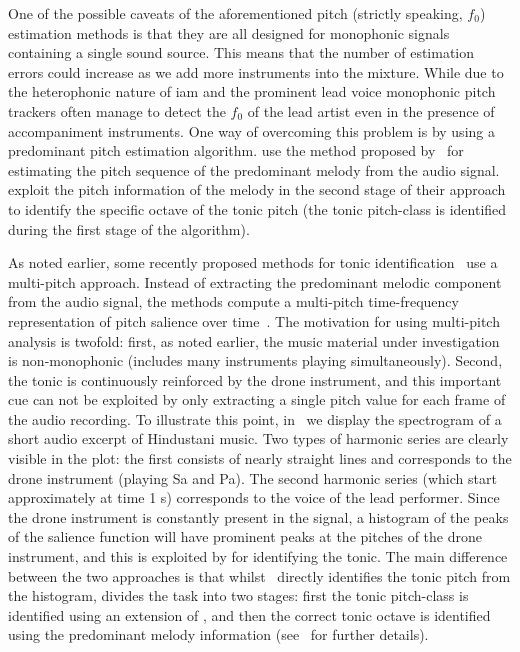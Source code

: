 {One of the possible caveats of the aforementioned pitch (strictly speaking, $f_0$) estimation methods is that they are all designed for monophonic signals containing a single sound source. This means that the number of estimation errors could increase as we add more instruments into the mixture. While due to the heterophonic nature of \gls{iam} and the prominent lead voice monophonic pitch trackers often manage to detect the $f_0$ of the lead artist even in the presence of accompaniment instruments. One way of overcoming this problem is by using a predominant pitch estimation algorithm. \cite{gulati2012two} use the method proposed by~\cite{Salamon2012} for estimating the pitch sequence of the predominant melody from the audio signal. \cite{gulati2012two} exploit the pitch information of the melody in the second stage of their approach to identify the specific octave of the tonic pitch (the tonic pitch-class is identified during the first stage of the algorithm).

As noted earlier, some recently proposed methods for tonic identification~\citep{salamon2012multipitch,gulati2012two} use a multi-pitch approach. Instead of extracting the predominant melodic component from the audio signal, the methods compute a multi-pitch time-frequency representation of pitch salience over time~\citep{Salamon2011}. The motivation for using multi-pitch analysis is twofold: first, as noted earlier, the music material under investigation is non-monophonic (includes many instruments playing simultaneously). Second, the tonic is continuously reinforced by the drone instrument, and this important cue can not be exploited by only extracting a single pitch value for each frame of the audio recording. To illustrate this point, in~ we display the spectrogram of a short audio excerpt of Hindustani music. Two types of harmonic series are clearly visible in the plot: the first consists of nearly straight lines and corresponds to the drone instrument (playing Sa and Pa). The second harmonic series (which start approximately at time 1 s) corresponds to the voice of the lead performer. Since the drone instrument is constantly present in the signal, a histogram of the peaks of the salience function will have prominent peaks at the pitches of the drone instrument, and this is exploited by \cite{SalamonSankalp2012,SGulatiIstanbul2012} for identifying the tonic. The main difference between the two approaches is that whilst~\citep{salamon2012multipitch} directly identifies the tonic pitch from the histogram, \cite{gulati2012two} divides the task into two stages: first the tonic pitch-class is identified using an extension of \cite{salamon2012multipitch}, and then the correct tonic octave is identified using the predominant melody information (see~\cite{Gulati2014Tonic} for further details).

}
